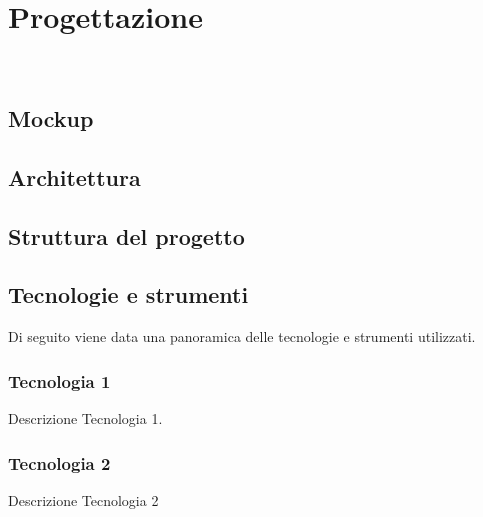 \chapter{Progettazione}
\label{cap:progettazione}

\\

\section{Mockup}
\label{sec:mockup}

\section{Architettura}
\label{sec:architettura}

\section{Struttura del progetto}
\label{sec:struttura-progetto}




\section{Tecnologie e strumenti}
\label{sec:tecnologie-strumenti}
Di seguito viene data una panoramica delle tecnologie e strumenti utilizzati.

\subsection*{Tecnologia 1}
Descrizione Tecnologia 1.

\subsection*{Tecnologia 2}
Descrizione Tecnologia 2